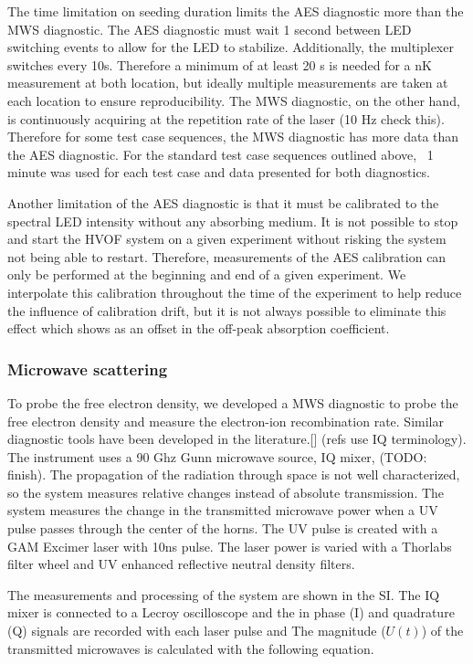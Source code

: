 The time limitation on seeding duration limits the AES diagnostic more than the MWS diagnostic. The AES diagnostic must wait 1 second between LED switching events to allow for the LED to stabilize. Additionally, the multiplexer switches every 10s. Therefore a minimum of at least 20 s is needed for a nK measurement at both location, but ideally multiple measurements are taken at each location to ensure reproducibility. The MWS diagnostic, on the other hand, is continuously acquiring at the repetition rate of the laser (10 Hz check this). Therefore for some test case sequences, the MWS diagnostic has more data than the AES diagnostic. For the standard test case sequences outlined above, ~1 minute was used for each test case and data presented for both diagnostics.  

Another limitation of the AES diagnostic is that it must be calibrated to the spectral LED intensity without any absorbing medium. It is not possible to stop and start the HVOF system on a given experiment without risking the system not being able to restart. Therefore, measurements of the AES calibration can only be performed at the beginning and end of a given experiment. We interpolate this calibration throughout the time of the experiment to help reduce the influence of calibration drift, but it is not always possible to eliminate this effect which shows as an offset in the off-peak absorption coefficient.

\subsubsection{Microwave scattering}

To probe the free electron density, we developed a MWS diagnostic to probe the free electron density and measure the electron-ion recombination rate. Similar diagnostic tools have been developed in the literature.[] (refs use IQ terminology). The instrument uses a 90 Ghz Gunn microwave source, IQ mixer, (TODO: finish). The propagation of the radiation through space is not well characterized, so the system measures relative changes instead of absolute transmission. The system measures the change in the transmitted microwave power when a UV pulse passes through the center of the horns. The UV pulse is created with a GAM Excimer laser with 10ns pulse. The laser power is varied with a Thorlabs filter wheel and UV enhanced reflective neutral density filters. 

The measurements and processing of the system are shown in the SI. The IQ mixer is connected to a Lecroy oscilloscope and the in phase (I) and quadrature (Q) signals are recorded with each laser pulse and The magnitude ($U(t)$) of the transmitted microwaves is calculated with the following equation. 

